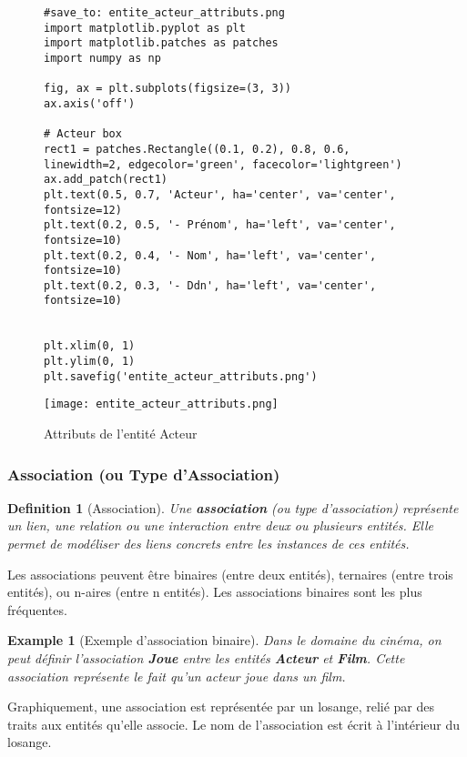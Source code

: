 \documentclass{article}
\newtheorem{definition}{Definition}
\newtheorem{example}{Example}
\begin{document}
\begin{figure}[H]
    \centering
    \begin{verbatim}
#save_to: entite_acteur_attributs.png
import matplotlib.pyplot as plt
import matplotlib.patches as patches
import numpy as np

fig, ax = plt.subplots(figsize=(3, 3))
ax.axis('off')

# Acteur box
rect1 = patches.Rectangle((0.1, 0.2), 0.8, 0.6, linewidth=2, edgecolor='green', facecolor='lightgreen')
ax.add_patch(rect1)
plt.text(0.5, 0.7, 'Acteur', ha='center', va='center', fontsize=12)
plt.text(0.2, 0.5, '- Prénom', ha='left', va='center', fontsize=10)
plt.text(0.2, 0.4, '- Nom', ha='left', va='center', fontsize=10)
plt.text(0.2, 0.3, '- Ddn', ha='left', va='center', fontsize=10)


plt.xlim(0, 1)
plt.ylim(0, 1)
plt.savefig('entite_acteur_attributs.png')

        \end{verbatim}
        \texttt{[image: entite\_acteur\_attributs.png]}
        \caption{Attributs de l'entité Acteur}
        \label{fig:entite_acteur_attributs}
\end{figure}


\subsubsection{Association (ou Type d'Association)}

\begin{definition}[Association]
    Une \textbf{association} (ou type d'association) représente un lien, une relation ou une interaction entre deux ou plusieurs entités.  Elle permet de modéliser des liens concrets entre les instances de ces entités.
\end{definition}

Les associations peuvent être binaires (entre deux entités), ternaires (entre trois entités), ou n-aires (entre n entités).  Les associations binaires sont les plus fréquentes.

\begin{example}[Exemple d'association binaire]
    Dans le domaine du cinéma, on peut définir l'association \textbf{Joue} entre les entités \textbf{Acteur} et \textbf{Film}.  Cette association représente le fait qu'un acteur joue dans un film.
\end{example}

Graphiquement, une association est représentée par un losange, relié par des traits aux entités qu'elle associe.  Le nom de l'association est écrit à l'intérieur du losange.
\end{document}
